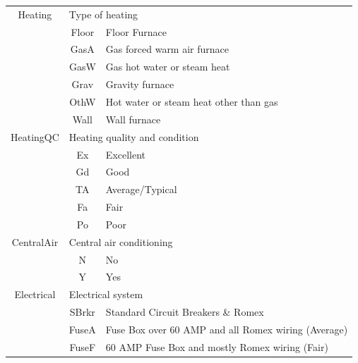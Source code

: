 \documentclass[11pt]{scrartcl} %
\begin{document}
\begin{center}
\begin{tabular}{c c c c c c}
\hline
\multicolumn{2}{|c}{Heating} & \multicolumn{4}{l|}{Type of heating}\\ 
\multicolumn{2}{|c}{} & \multicolumn{1}{c}{Floor} & \multicolumn{3}{l|}{Floor Furnace}\\
\multicolumn{2}{|c}{} & \multicolumn{1}{c}{GasA} & \multicolumn{3}{l|}{Gas forced warm air furnace}\\
\multicolumn{2}{|c}{} & \multicolumn{1}{c}{GasW} & \multicolumn{3}{l|}{Gas hot water or steam heat}\\
\multicolumn{2}{|c}{} & \multicolumn{1}{c}{Grav} & \multicolumn{3}{l|}{Gravity furnace}\\
\multicolumn{2}{|c}{} & \multicolumn{1}{c}{OthW} & \multicolumn{3}{l|}{Hot water or steam heat other than gas}\\
\multicolumn{2}{|c}{} & \multicolumn{1}{c}{Wall} & \multicolumn{3}{l|}{Wall furnace}\\
\hline
\multicolumn{2}{|c}{HeatingQC} & \multicolumn{4}{l|}{Heating quality and condition}\\ 
\multicolumn{2}{|c}{} & \multicolumn{1}{c}{Ex} & \multicolumn{3}{l|}{Excellent}\\
\multicolumn{2}{|c}{} & \multicolumn{1}{c}{Gd} & \multicolumn{3}{l|}{Good}\\
\multicolumn{2}{|c}{} & \multicolumn{1}{c}{TA} & \multicolumn{3}{l|}{Average/Typical}\\
\multicolumn{2}{|c}{} & \multicolumn{1}{c}{Fa} & \multicolumn{3}{l|}{Fair}\\
\multicolumn{2}{|c}{} & \multicolumn{1}{c}{Po} & \multicolumn{3}{l|}{Poor}\\
\hline
\multicolumn{2}{|c}{CentralAir} & \multicolumn{4}{l|}{Central air conditioning}\\ 
\multicolumn{2}{|c}{} & \multicolumn{1}{c}{N} & \multicolumn{3}{l|}{No}\\
\multicolumn{2}{|c}{} & \multicolumn{1}{c}{Y} & \multicolumn{3}{l|}{Yes}\\
\hline
\multicolumn{2}{|c}{Electrical} & \multicolumn{4}{l|}{Electrical system}\\ 
\multicolumn{2}{|c}{} & \multicolumn{1}{c}{SBrkr} & \multicolumn{3}{l|}{Standard Circuit Breakers \& Romex}\\
\multicolumn{2}{|c}{} & \multicolumn{1}{c}{FuseA} & \multicolumn{3}{l|}{Fuse Box over 60 AMP and all Romex wiring (Average)}\\
\multicolumn{2}{|c}{} & \multicolumn{1}{c}{FuseF} & \multicolumn{3}{l|}{60 AMP Fuse Box and mostly Romex wiring (Fair)}\\

\end{tabular}
\end{center}
\end{document}
